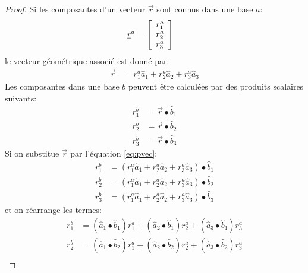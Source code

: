 \begin{proof}
Si les composantes d'un vecteur $\vec{r}$ sont connus dans une base $a$:
\begin{align}
\underline{r}^a &= \left[ \begin{array}{c} r_1^a \\ r_2^a \\ r_3^a  \end{array} \right]
\end{align} 
le vecteur géométrique associé est donné par:
\begin{align}
\vec{r} &= r_1^a \hat{a}_1 + r_2^a \hat{a}_2 + r_3^a \hat{a}_3
\label{eq:pvec}
\end{align} 
Les composantes dans une base $b$ peuvent être calculées par des produits scalaires suivants:
\begin{align}
r_1^b &= \vec{r} \bullet \hat{b}_1 \\
r_2^b &= \vec{r} \bullet \hat{b}_2 \\
r_3^b &= \vec{r} \bullet \hat{b}_3
\end{align} 
Si on substitue $\vec{r}$ par l'équation \eqref{eq:pvec}:
\begin{align}
r_1^b &= (r_1^a \hat{a}_1 + r_2^a \hat{a}_2 + r_3^a \hat{a}_3) \bullet \hat{b}_1 \\
r_2^b &= (r_1^a \hat{a}_1 + r_2^a \hat{a}_2 + r_3^a \hat{a}_3) \bullet \hat{b}_2 \\
r_3^b &= (r_1^a \hat{a}_1 + r_2^a \hat{a}_2 + r_3^a \hat{a}_3) \bullet \hat{b}_3
\end{align} 
et on réarrange les termes:
\begin{align}
r_1^b &= (\hat{a}_1 \bullet \hat{b}_1 ) r_1^a + (\hat{a}_2 \bullet \hat{b}_1 ) r_2^a + (\hat{a}_3 \bullet \hat{b}_1 ) r_3^a \\
r_2^b &= (\hat{a}_1 \bullet \hat{b}_2 ) r_1^a + (\hat{a}_2 \bullet \hat{b}_2 ) r_2^a + (\hat{a}_3 \bullet \hat{b}_2 ) r_3^a \\

\end{align}
\end{proof}

